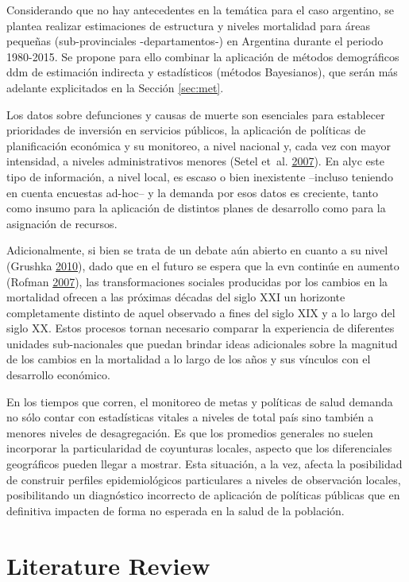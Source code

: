 \documentclass[12pt,spanish,]{article}
\begin{document}
Considerando que no hay antecedentes en la temática para el caso
argentino, se plantea realizar estimaciones de estructura y niveles
mortalidad para áreas pequeñas (sub-provinciales -departamentos-) en
Argentina durante el periodo 1980-2015. Se propone para ello combinar la
aplicación de métodos demográficos \gls{ddm} de estimación indirecta y
estadísticos (métodos Bayesianos), que serán más adelante explicitados
en la Sección \ref{sec:met}.

Los datos sobre defunciones y causas de muerte son esenciales para
establecer prioridades de inversión en servicios públicos, la aplicación
de políticas de planificación económica y su monitoreo, a nivel nacional
y, cada vez con mayor intensidad, a niveles administrativos menores
(Setel et~al. \protect\hyperlink{ref-SetelEtAl2007}{2007}). En
\gls{alyc} este tipo de información, a nivel local, es escaso o bien
inexistente --incluso teniendo en cuenta encuestas ad-hoc-- y la demanda
por esos datos es creciente, tanto como insumo para la aplicación de
distintos planes de desarrollo como para la asignación de recursos.

Adicionalmente, si bien se trata de un debate aún abierto en cuanto a su
nivel (Grushka \protect\hyperlink{ref-Grushka2010}{2010}), dado que en
el futuro se espera que la \gls{evn} continúe en aumento (Rofman
\protect\hyperlink{ref-Rofman2007}{2007}), las transformaciones sociales
producidas por los cambios en la mortalidad ofrecen a las próximas
décadas del siglo XXI un horizonte completamente distinto de aquel
observado a fines del siglo XIX y a lo largo del siglo XX. Estos
procesos tornan necesario comparar la experiencia de diferentes unidades
sub-nacionales que puedan brindar ideas adicionales sobre la magnitud de
los cambios en la mortalidad a lo largo de los años y sus vínculos con
el desarrollo económico.

En los tiempos que corren, el monitoreo de metas y políticas de salud
demanda no sólo contar con estadísticas vitales a niveles de total país
sino también a menores niveles de desagregación. Es que los promedios
generales no suelen incorporar la particularidad de coyunturas locales,
aspecto que los diferenciales geográficos pueden llegar a mostrar. Esta
situación, a la vez, afecta la posibilidad de construir perfiles
epidemiológicos particulares a niveles de observación locales,
posibilitando un diagnóstico incorrecto de aplicación de políticas
públicas que en definitiva impacten de forma no esperada en la salud de
la población.

\hypertarget{ch:litreview}{%
\section{Literature Review}\label{ch:litreview}}
\end{document}
